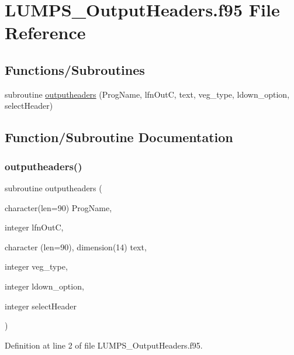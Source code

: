 \hypertarget{_l_u_m_p_s___output_headers_8f95}{}\section{L\+U\+M\+P\+S\+\_\+\+Output\+Headers.\+f95 File Reference}
\label{_l_u_m_p_s___output_headers_8f95}
\subsection*{Functions/\+Subroutines}
\begin{DoxyCompactItemize}
\item 
subroutine \hyperlink{_l_u_m_p_s___output_headers_8f95_a1cf843850f106c955116b8e377798152}{outputheaders} (Prog\+Name, lfn\+OutC, text, veg\+\_\+type, ldown\+\_\+option, select\+Header)
\end{DoxyCompactItemize}


\subsection{Function/\+Subroutine Documentation}
\mbox{\label{_l_u_m_p_s___output_headers_8f95_a1cf843850f106c955116b8e377798152}} 
\subsubsection{\texorpdfstring{outputheaders()}{outputheaders()}}
{\footnotesize\ttfamily subroutine outputheaders (\begin{DoxyParamCaption}\item[{character(len=90)}]{Prog\+Name,  }\item[{integer}]{lfn\+OutC,  }\item[{character (len=90), dimension(14)}]{text,  }\item[{integer}]{veg\+\_\+type,  }\item[{integer}]{ldown\+\_\+option,  }\item[{integer}]{select\+Header }\end{DoxyParamCaption})}



Definition at line 2 of file L\+U\+M\+P\+S\+\_\+\+Output\+Headers.\+f95.

